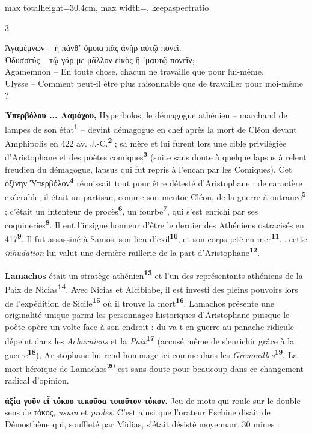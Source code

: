 \documentclass[11pt,twoside]{book}
\newcommand{\italique}[1]{\textit{#1}}
\newcommand{\citComm}[1]{\begin{quoting}[vskip=0.4pt,leftmargin=0.7em,rightmargin=0.2em]#1\end{quoting}}
\newcommand{\latin}[1]{\textit{#1}}
\newcommand{\marqueur}[1]{\textsuperscript{\color{rubricRed}\textbf{#1}}}
\begin{document}
\begin{adjustbox}{max totalheight=30.4cm, max width=\textwidth, keepaspectratio}
\begin{minipage}{\textwidth}
{\begin{multicols}{3}
\citComm{Ἀγαμέμνων -- ἡ πάνθ᾽ ὅμοια πᾶς ἀνὴρ αὑτῷ πονεῖ.\\
Ὀδυσσεύς -- τῷ γάρ με μᾶλλον εἰκὸς ἢ ᾽μαυτῷ πονεῖν;\\
Agamemnon -- En toute chose, chacun ne travaille que pour lui-même.\\
Ulysse -- Comment peut-il être plus raisonnable que de travailler pour moi-même ?}
\par\vspace{1.5pt}
 \textbf{Ὑπερβόλου ... Λαμάχου,} Hyperbolos, le démagogue athénien -- marchand de lampes de son état\marqueur{1} -- devint démagogue en chef après la mort de Cléon devant Amphipolis en 422 av. J.-C.\marqueur{2} ; sa mère et lui furent lors une cible privilégiée d'Aristophane et des poètes comiques\marqueur{3} (suite sans doute à quelque lapsus à relent freudien du démagogue, lapsus qui fut repris à l'encan par les Comiques). Cet ὀξίνην Ὑπερβόλον\marqueur{4} réunissait tout pour être détesté d'Aristophane : de caractère exécrable, il était un partisan, comme son mentor Cléon, de la guerre à outrance\marqueur{5} ; c'était un intenteur de procès\marqueur{6}, un fourbe\marqueur{7}, qui s'est enrichi par ses coquineries\marqueur{8}. Il eut l'insigne honneur d'être le dernier des Athéniens ostracisés en 417\marqueur{9}. Il fut assassiné à Samos, son lieu d'exil\marqueur{10}, et son corps jeté en mer\marqueur{11}... cette \italique{inhudation} lui valut une dernière raillerie de la part d'Aristophane\marqueur{12}.
\par\vspace{1.5pt}
\noindent \textbf{Lamachos} était un stratège athénien\marqueur{13} et l'un des représentants athéniens de la Paix de Nicias\marqueur{14}. Avec Nicias et Alcibiabe, il est investi des pleins pouvoirs lors de l'expédition de Sicile\marqueur{15} où il trouve la mort\marqueur{16}. Lamachos présente une originalité unique parmi les personnages historiques d'Aristophane puisque le poète opère un volte-face à son endroit : du va-t-en-guerre au panache ridicule dépeint dans les \italique{Acharniens} et la \italique{Paix}\marqueur{17} (accusé même de s'enrichir grâce à la guerre\marqueur{18}), Aristophane lui rend hommage ici comme dans les \italique{Grenouilles}\marqueur{19}. La mort héroïque de Lamachos\marqueur{20} est sans doute pour beaucoup dans ce changement radical d'opinion.
\par\vspace{1.5pt}
 \textbf{ἀξία γοῦν εἶ τόκου τεκοῦσα τοιοῦτον τόκον.} Jeu de mots qui roule sur le double sens de τόκος, \latin{usura} et \latin{proles}. C'est ainsi que l'orateur Eschine disait de Démosthène qui, souffleté par Midias, s'était désisté moyennant 30 mines :

\end{multicols}}
\end{minipage}
\end{adjustbox}
\end{document}
